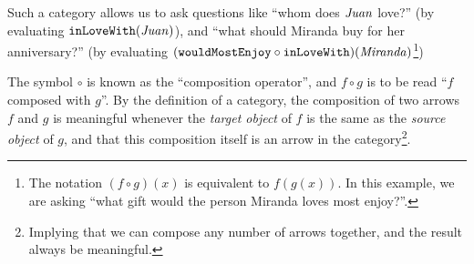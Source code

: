 \documentclass[12pt]{book}
\renewcommand{\value}[1]{\ensuremath{\text{\textit{#1}}}}
\newcommand{\func}[1]{\ensuremath{\text{\texttt{#1}}}}
\begin{document}
Such a category allows us to ask questions like ``whom does \value{Juan} love?'' (by evaluating
$\func{inLoveWith}(\value{Juan})$), and ``what should Miranda buy for her anniversary?'' (by evaluating
$(\func{wouldMostEnjoy}\circ\func{inLoveWith})(\value{Miranda})$\footnote{The notation $(f\circ g)(x)$ is equivalent to
    $f(g(x))$. In this example, we are asking ``what gift would the person Miranda loves most enjoy?''.})

The symbol $\circ$ is known as the ``composition operator'', and $f\circ g$ is to be read ``$f$ composed with $g$''. By
the definition of a category, the composition of two arrows $f$ and $g$ is meaningful whenever the \textit{target
object} of $f$ is the same as the \textit{source object} of $g$, and
that this composition itself is an arrow in the category\footnote{Implying that we can compose any number of arrows
together, and the result always be meaningful.}.
\end{document}
